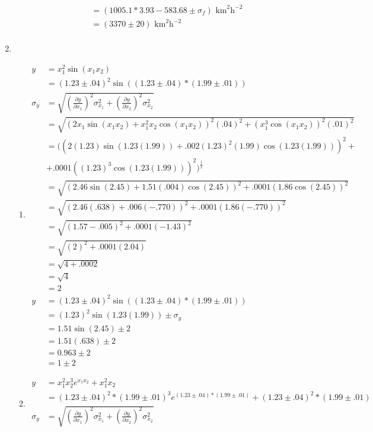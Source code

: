 \documentclass{article}
\begin{document}
\begin{enumerate}
\begin{enumerate}
\begin{align*}
&= (1005.1 * 3.93 - 583.68 \pm \sigma_{f})\text{ km}^2\text{h}^{-2}\\
&= (3370 \pm 20)\text{ km}^2\text{h}^{-2}\\
\end{align*}
\end{enumerate}
\item
\begin{enumerate}
\item
\begin{align*}
y &= x_1^2\sin(x_1x_2)\\
&= (1.23 \pm .04)^2\sin((1.23 \pm .04) * (1.99 \pm .01))\\
\sigma_{y} &= \sqrt{(\frac{\partial y}{\partial x_1})^2\sigma_{x_1}^2 + (\frac{\partial y}{\partial x_2})^2\sigma_{x_2}^2}\\
&= \sqrt{(2x_1\sin(x_1x_2) + x_1^2x_2\cos(x_1x_2))^2(.04)^2 + (x_1^3\cos(x_1x_2))^2(.01)^2}\\
&= ((2(1.23)\sin(1.23(1.99)) + .002(1.23)^2(1.99)\cos(1.23(1.99)))^2 +\\
&+ .0001((1.23)^3\cos(1.23(1.99)))^2)^\frac12\\
&= \sqrt{(2.46\sin(2.45) + 1.51(.004)\cos(2.45))^2 + .0001(1.86\cos(2.45))^2}\\
&= \sqrt{(2.46(.638) + .006(-.770))^2 + .0001(1.86(-.770))^2}\\
&= \sqrt{(1.57 - .005)^2 + .0001(-1.43)^2}\\
&= \sqrt{(2)^2 + .0001(2.04)}\\
&= \sqrt{4 + .0002}\\
&= \sqrt{4}\\
&= 2\\
y &= (1.23 \pm .04)^2\sin((1.23 \pm .04) * (1.99 \pm .01))\\
&= (1.23)^2\sin(1.23(1.99)) \pm \sigma_{y}\\
&= 1.51\sin(2.45) \pm 2\\
&= 1.51(.638) \pm 2\\
&= 0.963 \pm 2\\
&= 1 \pm 2
\end{align*}
\item
\begin{align*}
y &= x_1^2x_2^3e^{x_1x_2} + x_1^2x_2\\
&= (1.23 \pm .04)^2 * (1.99 \pm .01)^3e^{(1.23 \pm .04) * (1.99 \pm .01)} + (1.23 \pm .04)^2 * (1.99 \pm .01)\\
\sigma_{y} &= \sqrt{(\frac{\partial y}{\partial x_1})^2\sigma_{x_1}^2 + (\frac{\partial y}{\partial x_2})^2\sigma_{x_2}^2}\\

\end{align*}
\end{enumerate}
\end{enumerate}
\end{document}

